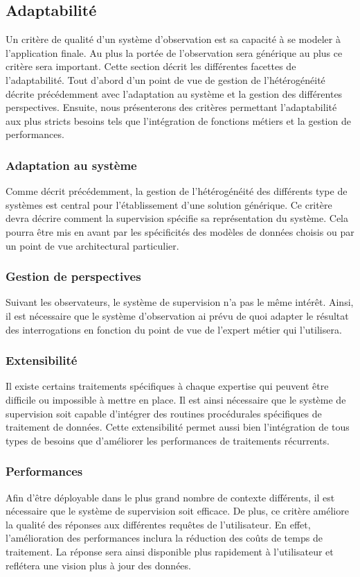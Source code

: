 \subsection{Adaptabilité}
Un critère de qualité d'un système d'observation est sa capacité à se modeler à l'application finale. Au plus la portée de l'observation sera générique au plus ce critère sera important. Cette section décrit les différentes facettes de l'adaptabilité. Tout d'abord d'un point de vue de gestion de l'hétérogénéité décrite précédemment avec l'adaptation au système et la gestion des différentes perspectives. Ensuite, nous présenterons des critères permettant l'adaptabilité aux plus stricts besoins tels que l'intégration de fonctions métiers et la gestion de performances.

\subsubsection{Adaptation au système}
Comme décrit précédemment, la gestion de l'hétérogénéité des différents type de systèmes est central pour l'établissement d'une solution générique. Ce critère devra décrire comment la supervision spécifie sa représentation du système. Cela pourra être mis en avant par les spécificités des modèles de données choisis ou par un point de vue architectural particulier.

\subsubsection{Gestion de perspectives}
Suivant les observateurs, le système de supervision n'a pas le même intérêt. Ainsi, il est nécessaire que le système d'observation ai prévu de quoi adapter le résultat des interrogations en fonction du point de vue de l'expert métier qui l'utilisera.

\subsubsection{Extensibilité}
Il existe certains traitements spécifiques à chaque expertise qui peuvent être difficile ou impossible à mettre en place. Il est ainsi nécessaire que le système de supervision soit capable d'intégrer des routines procédurales spécifiques de traitement de données. Cette extensibilité permet aussi bien l'intégration de tous types de besoins que d'améliorer les performances de traitements récurrents.

\subsubsection{Performances}
Afin d'être déployable dans le plus grand nombre de contexte différents, il est nécessaire que le système de supervision soit efficace. De plus, ce critère améliore la qualité des réponses aux différentes requêtes de l'utilisateur. En effet, l'amélioration des performances inclura la réduction des coûts de temps de traitement. La réponse sera ainsi disponible plus rapidement à l'utilisateur et reflétera une vision plus à jour des données.